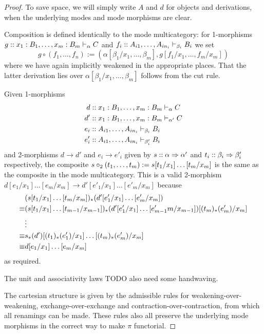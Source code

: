 \begin{proof}
To save space, we will simply write $A$ and $d$ for objects and derivations, when the underlying modes and mode morphisms are clear.

Composition is defined identically to the mode multicategory: for 1-morphisms $g :: x_1 : B_1, \dots, x_m : B_m \vdash_{\alpha} C$ and $f_i :: A_{i1}, \dots, A_{in_i} \vdash_{\beta_i} B_i$ we set \[g \circ (f_1, \dots, f_n) := (\alpha[\beta_1/x_1, \dots, \beta_m], g[f_1/x_1, \dots, f_m/x_m])\] where we have again implicitly weakened in the appropriate places. That the latter derivation lies over $\alpha[\beta_1/x_1, \dots, \beta_m]$ follows from the cut rule. 

Given 1-morphisms 
\begin{align*}
d &:: x_1 : B_1, \dots, x_m : B_m \vdash_{\alpha} C \\
d' &:: x_1 : B_1, \dots, x_m : B_m \vdash_{\alpha'} C \\
e_i &:: A_{i1}, \dots, A_{in_i} \vdash_{\beta_i} B_i \\
e'_i &:: A_{i1}, \dots, A_{in_i} \vdash_{\beta'_i} B_i 
\end{align*}
and 2-morphisms $d \to d'$ and $e_i \to e'_i$ given by $s :: \alpha \Rightarrow \alpha'$ and $t_i :: \beta_i \Rightarrow \beta'_i$ respectively, the composite $s \mathbin{\circ_2} (t_1, \dots, t_m) := s[t_1/x_1]\dots[t_m/x_m]$ is the same as the composite in the mode multicategory. This is a valid 2-morphism $d[e_1/x_1]\dots[e_m/x_m] \to d'[e'_1/x_1]\dots[e'_m/x_m]$ because
\begin{align*}
&(s[t_1/x_1]\dots[t_m/x_m])_*(d'[e'_1/x_1]\dots[e'_m/x_m]) \\
\equiv &(s[t_1/x_1]\dots[t_{m-1}/x_{m-1}])_*	(d'[e'_1/x_1]\dots[e'_{m-1}m/x_{m-1}])[(t_m)_*(e'_m)/x_m] \\
&\vdots \\
\equiv &s_*(d')[(t_1)_*(e'_1)/x_1] \dots[(t_m)_*(e'_m)/x_m] \\
\equiv &d[e_1/x_1] \dots[e_m/x_m]
\end{align*}
as required.

The unit and associativity laws TODO also need some handwaving.

The cartesian structure is given by the admissible rules for weakening-over-weakening, exchange-over-exchange and contraction-over-contraction, from which all renamings can be made. These rules also all preserve the underlying mode morphisms in the correct way to make $\pi$ functorial.


\end{proof}

